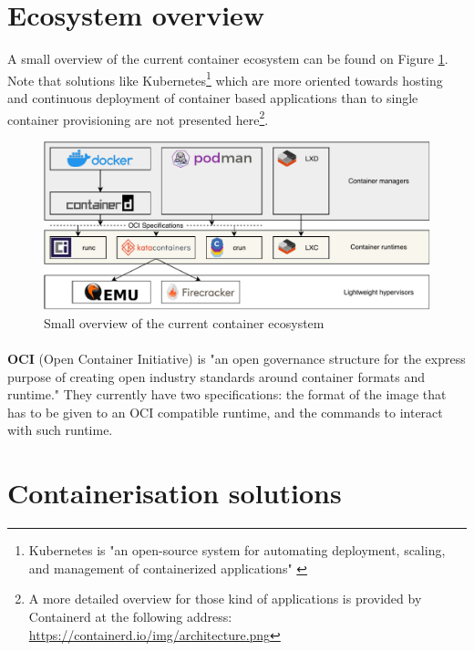 \section{Ecosystem overview}
A small overview of the current container ecosystem can be found on Figure \ref{fig:overview}.  Note that solutions like Kubernetes\footnote{Kubernetes is "an open-source system for automating deployment, scaling, and management of containerized applications" \cite{kubernetes}} which are more oriented towards hosting and continuous deployment of container based applications than to single container provisioning are not presented here\footnote{A more detailed overview for those kind of applications is provided by Containerd at the following address: \href{https://containerd.io/img/architecture.png}{https://containerd.io/img/architecture.png}}.
\begin{figure}[h!]
  \begin{center}
    \includegraphics[width=\linewidth]{images/ecosystem.pdf}
    \caption{Small overview of the current container ecosystem}
    \label{fig:overview}
  \end{center}
\end{figure}
\paragraph{}\textbf{OCI} (Open Container Initiative) is "an open governance structure for the express purpose of creating open industry standards around container formats and runtime."\cite{oci} They currently have two specifications: the format of the image that has to be given to an OCI compatible runtime, and the commands to interact with such runtime.

\section{Containerisation solutions}
